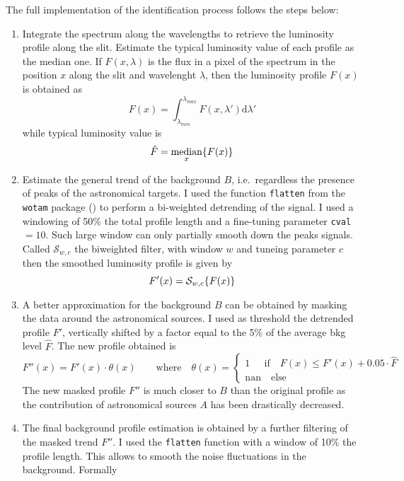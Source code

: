 The full implementation of the identification process follows the steps below:
\begin{enumerate}
	\item Integrate the spectrum along the wavelengths to retrieve the luminosity profile along the slit. Estimate the typical luminosity value of each profile as the median one. If $F(x,\lambda)$ is the flux in a pixel of the spectrum in the position $x$ along the slit and wavelenght $\lambda$, then the luminosity profile $F(x)$ is obtained as
	\begin{equation}
		F(x)=\int_{\lambda_{min}}^{\lambda_{max}}F(x,\lambda')\text{d}\lambda'
	\end{equation}
	while typical luminosity value is
	\begin{equation}
		\hat F = \underset{x}{\text{median}}\large\{ F(x) \large\}
	\end{equation}
	\item Estimate the general trend of the background $B$, i.e.\ regardless the presence of peaks of the astronomical targets. I used the function \texttt{flatten} from the \texttt{wotam} package () to perform a bi-weighted detrending of the signal. I used a windowing of 50\% the total profile length and a fine-tuning parameter \texttt{cval}$=10$. Such large window can only partially smooth down the peaks signals. Called $\mathcal{S}_{w,c}$ the biweighted filter, with window $w$ and tuneing parameter $c$ then the smoothed luminosity profile is given by
	\begin{equation}
		F'(x)= \mathcal{S}_{w,c}\large\{ F(x) \large\}
	\end{equation}
	\item A better approximation for the background $B$ can be obtained by masking the data around the astronomical sources. I
	used as threshold the detrended profile $F'$, vertically shifted by a factor equal to the 5\% of the average
	bkg level $\hat F$. The new profile obtained is
	\begin{equation}
		F''(x) = F'(x)\cdot\theta(x)\qquad\text{where}\quad\theta(x)=\begin{cases}
		1\ \ \quad \text{if}\quad F(x) \leq F'(x)+0.05\cdot\hat{F}\\
		\text{nan}\quad\text{else}
		\end{cases}
	\end{equation}
	The new masked profile $F''$ is much closer to $B$ than the original profile as the contribution of astronomical sources $A$ has been drastically decreased.
	\item The final background profile estimation is obtained by a further filtering of the masked trend $F''$. I used the \texttt{flatten} function with a window of 10\% the profile length. This allows to smooth the noise fluctuations in the background. Formally

\end{enumerate}
